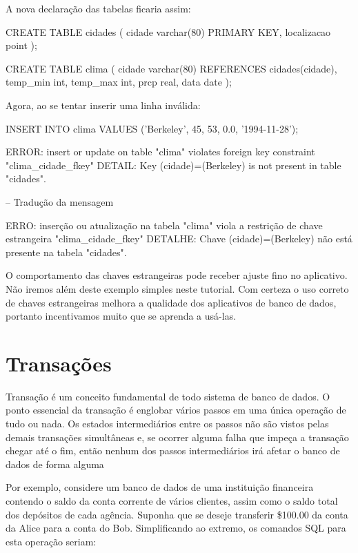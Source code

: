 A nova declaração das tabelas ficaria assim:

\begin{BoxVerbatim}
CREATE TABLE cidades (
       cidade      varchar(80) PRIMARY KEY,
       localizacao point
);

CREATE TABLE clima (
        cidade     varchar(80) REFERENCES cidades(cidade),
        temp_min   int,
        temp_max   int,
        prcp       real,
        data       date
);
\end{BoxVerbatim}

Agora, ao se tentar inserir uma linha inválida:
\begin{BoxVerbatim}
INSERT INTO clima VALUES ('Berkeley', 45, 53, 0.0, '1994-11-28');

ERROR:  insert or update on table "clima" violates foreign key constraint "clima_cidade_fkey"
DETAIL:  Key (cidade)=(Berkeley) is not present in table "cidades".

-- Tradução da mensagem

ERRO:  inserção ou atualização na tabela "clima" viola a restrição de chave estrangeira "clima_cidade_fkey"
DETALHE:  Chave (cidade)=(Berkeley) não está presente na tabela "cidades".
\end{BoxVerbatim}

O comportamento das chaves estrangeiras pode receber ajuste fino no aplicativo. Não iremos além deste exemplo simples neste tutorial. 
Com certeza o uso correto de chaves estrangeiras melhora a qualidade dos aplicativos de banco de dados, portanto incentivamos muito que se aprenda a usá-las.


\section{Transações}\setcounter{SteP}{1}
Transação é um conceito fundamental de todo sistema de banco de dados. O ponto essencial da transação é englobar vários 
passos em uma única operação de tudo ou nada. Os estados intermediários entre os passos não são vistos pelas demais 
transações simultâneas e, se ocorrer alguma falha que impeça a transação chegar até o fim, 
então nenhum dos passos intermediários irá afetar o banco de dados de forma alguma

Por exemplo, considere um banco de dados de uma instituição financeira contendo o saldo da conta corrente de vários 
clientes, assim como o saldo total dos depósitos de cada agência. Suponha que se deseje transferir 
\$100.00 da conta da Alice para a conta do Bob. Simplificando ao extremo, os comandos SQL para esta operação seriam:

